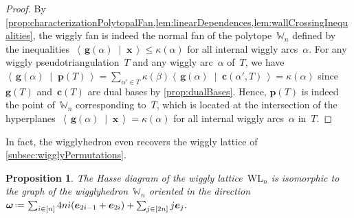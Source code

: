 \documentclass{amsart}
\newtheorem{proposition}[theorem]{Proposition}
\theoremstyle{definition}
\renewcommand{\b}[1]{{\boldsymbol{#1}}} %
\newcommand{\dotprod}[2]{\left\langle \, #1 \; \middle| \; #2 \, \right\rangle} %
\newcommand{\eqdef}{\mbox{\,\raisebox{0.2ex}{\scriptsize\ensuremath{\mathrm:}}\ensuremath{=}\,}} %
\newcommand{\polytope}[1]{\mathds{#1}} %
\newcommand{\wigglyLattice}{\mathrm{WL}} %
\newcommand{\wigglyhedron}{\polytope{W}} %
\begin{document}
\begin{proof}
By \cref{prop:characterizationPolytopalFan,lem:linearDependences,lem:wallCrossingInequalities}, the wiggly fan is indeed the normal fan of the polytope~$\wigglyhedron_n$ defined by the inequalities~$\dotprod{\b{g}(\alpha)}{\b{x}} \le \kappa(\alpha)$ for all internal wiggly arcs~$\alpha$.
For any wiggly pseudotriangulation~$T$ and any wiggly arc~$\alpha$ of~$T$, we have~$\dotprod{\b{g}(\alpha)}{\b{p}(T)} = \sum_{\alpha' \in T} \kappa(\beta) \dotprod{\b{g}(\alpha)}{\b{c}(\alpha', T)} = \kappa(\alpha)$ since~$\b{g}(T)$ and~$\b{c}(T)$ are dual bases by \cref{prop:dualBases}.
Hence, $\b{p}(T)$ is indeed the point of~$\wigglyhedron_n$ corresponding to~$T$, which is located at the intersection of the hyperplanes~$\dotprod{\b{g}(\alpha)}{\b{x}} = \kappa(\alpha)$ for all internal wiggly arcs~$\alpha$ in~$T$.
\end{proof}

In fact, the wigglyhedron even recovers the wiggly lattice of \cref{subsec:wigglyPermutations}.

\begin{proposition}
The Hasse diagram of the wiggly lattice~$\wigglyLattice_n$ is isomorphic to the graph of the wigglyhedron~$\wigglyhedron_n$ oriented in the direction
\(
\b{\omega} \eqdef \sum_{i \in [n]} 4ni (\b{e}_{2i-1} + \b{e}_{2i}) + \sum_{j \in [2n]} j \b{e}_j.
\)
\end{proposition}
\end{document}
